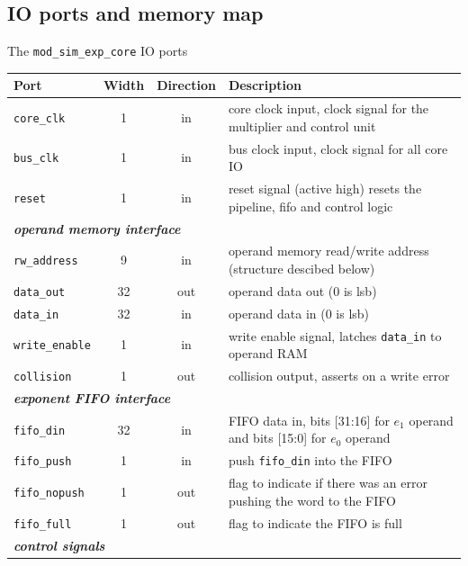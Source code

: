 \subsection{IO ports and memory map}
The \verb|mod_sim_exp_core| IO ports\\
\newline
\begin{tabular}{|l|c|c|p{8cm}|}
\hline
\rowcolor{Gray}
\textbf{Port} & \textbf{Width} & \textbf{Direction} & \textbf{Description} \bigstrut\\
\hline
\verb|core_clk|   & 1     & in    & core clock input, clock signal for the multiplier and control unit \bigstrut\\
\hline
\verb|bus_clk|   & 1     & in    & bus clock input, clock signal for all core IO \bigstrut\\
\hline
\verb|reset| & 1     & in    & reset signal (active high) resets the pipeline, fifo and control logic \bigstrut\\
\hline
\multicolumn{4}{|l|}{\textbf{\textit{operand memory interface}}} \bigstrut\\
\hline
\verb|rw_address| & 9     & in    & operand memory read/write address (structure descibed below) \bigstrut\\
\hline
\verb|data_out| & 32    & out   & operand data out (0 is lsb) \bigstrut\\
\hline
\verb|data_in| & 32    & in    & operand data in (0 is lsb) \bigstrut\\
\hline
\verb|write_enable| & 1     & in    & write enable signal, latches \verb|data_in| to operand RAM \bigstrut\\
\hline
\verb|collision| & 1     & out   & collision output, asserts on a write error \bigstrut\\
\hline
\multicolumn{4}{|l|}{\textbf{\textit{exponent FIFO interface}}} \bigstrut\\
\hline
\verb|fifo_din| & 32    & in    & FIFO data in, bits [31:16] for $e_1$ operand and bits [15:0] for $e_0$ operand \bigstrut\\
\hline
\verb|fifo_push| & 1     & in    & push \verb|fifo_din| into the FIFO \bigstrut\\
\hline
\verb|fifo_nopush| & 1     & out   & flag to indicate if there was an error pushing the word to the FIFO \bigstrut\\
\hline
\verb|fifo_full| & 1     & out   & flag to indicate the FIFO is full \bigstrut\\
\hline
\multicolumn{4}{|l|}{\textbf{\textit{control signals}}} \bigstrut\\

\end{tabular}
